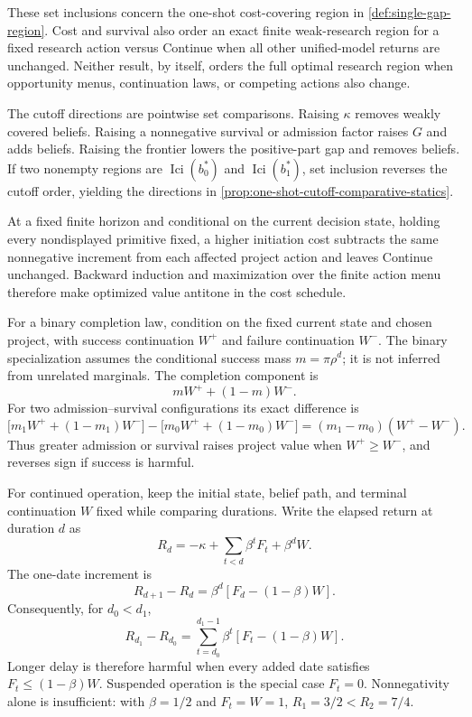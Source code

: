 These set inclusions concern the one-shot cost-covering region in
\cref{def:single-gap-region}.  Cost and survival also order an exact finite
weak-research region for a fixed research action versus Continue when all
other unified-model returns are unchanged.  Neither result, by itself, orders
the full optimal research region when opportunity menus, continuation laws,
or competing actions also change.

The cutoff directions are pointwise set comparisons.  Raising \(\kappa\)
removes weakly covered beliefs.  Raising a nonnegative survival or admission
factor raises \(G\) and adds beliefs.  Raising the frontier lowers the
positive-part gap and removes beliefs.  If two nonempty regions are
\(\operatorname{Ici}(b_0^*)\) and \(\operatorname{Ici}(b_1^*)\), set
inclusion reverses the cutoff order, yielding the directions in
\cref{prop:one-shot-cutoff-comparative-statics}.

At a fixed finite horizon and conditional on the current decision state,
holding every nondisplayed primitive fixed, a higher initiation cost subtracts
the same nonnegative increment from each affected project action and leaves
Continue unchanged.  Backward induction and maximization over the finite
action menu therefore make optimized value antitone in the cost schedule.

For a binary completion law, condition on the fixed current state and chosen
project, with success continuation \(W^+\) and failure continuation \(W^-\).
The binary specialization assumes the conditional success mass
\(m=\pi\rho^d\); it is not inferred from unrelated marginals.  The completion
component is
\[
  mW^+ +(1-m)W^-.
\]
For two admission--survival configurations its exact difference is
\[
  \bigl[m_1W^+ +(1-m_1)W^-\bigr]
  -
  \bigl[m_0W^+ +(1-m_0)W^-\bigr]
  =(m_1-m_0)(W^+-W^-).
\]
Thus greater admission or survival raises project value when
\(W^+\ge W^-\), and reverses sign if success is harmful.

For continued operation, keep the initial state, belief path, and terminal
continuation \(W\) fixed while comparing durations.  Write the elapsed return
at duration \(d\) as
\[
  R_d=-\kappa+\sum_{t<d}\beta^tF_t+\beta^dW .
\]
The one-date increment is
\[
  R_{d+1}-R_d
  =\beta^d\!\left[F_d-(1-\beta)W\right].
\]
Consequently, for \(d_0<d_1\),
\[
  R_{d_1}-R_{d_0}
  =\sum_{t=d_0}^{d_1-1}
    \beta^t\!\left[F_t-(1-\beta)W\right].
\]
Longer delay is therefore harmful when every added date satisfies
\(F_t\le(1-\beta)W\).  Suspended operation is the special case \(F_t=0\).
Nonnegativity alone is insufficient: with \(\beta=1/2\) and \(F_t=W=1\),
\(R_1=3/2<R_2=7/4\).

